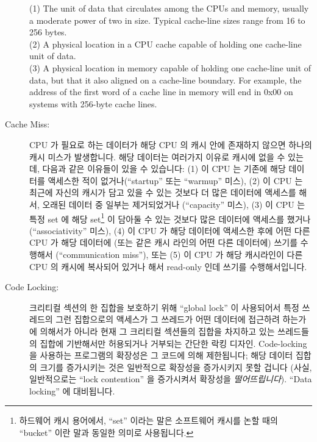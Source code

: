 \begin{description}
	(1) The unit of data that circulates among the CPUs and memory,
	usually a moderate power of two in size.
	Typical cache-line sizes range from 16 to 256 bytes. \\
	(2) A physical location in a CPU cache capable of holding
	one cache-line unit of data. \\
	(3) A physical location in memory capable of holding one
	cache-line unit of data, but that it also aligned
	on a cache-line boundary.
	For example, the address of the first word of a cache line
	in memory will end in 0x00 on systems with 256-byte cache lines.
	\fi
\item[Cache Miss:]
	CPU 가 필요로 하는 데이터가 해당 CPU 의 캐시 안에 존재하지 않으면
	하나의 캐시 미스가 발생합니다.
	해당 데이터는 여러가지 이유로 캐시에 없을 수 있는데, 다음과 같은
	이유들이 있을 수 있습니다:
	(1) 이 CPU 는 기존에 해당 데이터를 액세스한 적이 없거나(``startup''
	또는 ``warmup'' 미스),
	(2) 이 CPU 는 최근에 자신의 캐시가 담고 있을 수 있는 것보다 더 많은
	데이터에 액세스를 해서, 오래된 데이터 중 일부는 제거되었거나
	(``capacity'' 미스),
	(3) 이 CPU 는 특정 set 에 해당 set\footnote{
		하드웨어 캐시 용어에서, ``set'' 이라는 말은 소프트웨어 캐시를
		논할 때의 ``bucket'' 이란 말과 동일한 의미로 사용됩니다.}
	이 담아둘 수 있는 것보다 많은 데이터에 액세스를 했거나
	(``associativity'' 미스),
	(4) 이 CPU 가 해당 데이터에 액세스한 후에 어떤 다른 CPU 가 해당
	데이터에 (또는 같은 캐시 라인의 어떤 다른 데이터에) 쓰기를 수행해서
	(``communication miss''), 또는
	(5) 이 CPU 가 해당 캐시라인이 다른 CPU 의 캐시에 복사되어 있거나 해서
	read-only 인데 쓰기를 수행해서입니다.
	\iffalse

	A cache miss occurs when data needed by the CPU is not in
	that CPU's cache.
	The data might be missing because of a number of reasons,
	including:
	(1) this CPU has never accessed the data before
	(``startup'' or ``warmup'' miss),
	(2) this CPU has recently accessed more
	data than would fit in its cache, so that some of the older
	data had to be removed (``capacity'' miss),
	(3) this CPU
	has recently accessed more data in a given set\footnote{
		In hardware-cache terminology, the word ``set''
		is used in the same way that the word ``bucket''
		is used when discussing software caches.}
	than that set could hold (``associativity'' miss),
	(4) some other CPU has written to the data (or some other
	data in the same cache line) since this CPU has accessed it
	(``communication miss''), or
	(5) this CPU attempted to write to a cache line that is
	currently read-only, possibly due to that line being replicated
	in other CPUs' caches.
	\fi
\item[Code Locking:]
	크리티컬 섹션의 한 집합을 보호하기 위해 ``global lock'' 이 사용되어서
	특정 쓰레드의 그런 집합으로의 액세스가 그 쓰레드가 어떤 데이터에
	접근하려 하는가에 의해서가 아니라 현재 그 크리티컬 섹션들의 집합을
	차지하고 있는 쓰레드들의 집합에 기반해서만 허용되거나 거부되는 간단한
	락킹 디자인.
	Code-locking 을 사용하는 프로그램의 확장성은 그 코드에 의해 제한됩니다;
	해당 데이터 집합의 크기를 증가시키는 것은 일반적으로 확장성을
	증가시키지 못할 겁니다 (사실, 일반적으로는 ``lock contention'' 을
	증가시켜서 확장성을 \emph{떨어뜨립니다}).
	``Data locking'' 에 대비됩니다.
	\iffalse


\end{description}
